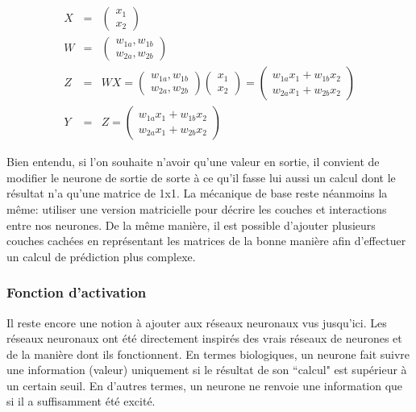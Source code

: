 \documentclass[11pt,a4paper]{report}
\begin{document}
    \begin{eqnarray}
    X &=& \begin{pmatrix} x_1 \\ x_2 \end{pmatrix} \\
    W &=& \begin{pmatrix} w_{1a} , w_{1b} \\ w_{2a}, w_{2b} \end{pmatrix} \\
    Z &=& WX  = \begin{pmatrix} w_{1a} , w_{1b} \\ w_{2a}, w_{2b} \end{pmatrix}\begin{pmatrix} x_1 \\ x_2 \end{pmatrix} = \begin{pmatrix} w_{1a}x_1 + w_{1b}x_2 \\ w_{2a}x_1+w_{2b}x_2 \end{pmatrix} \\
    Y &=& Z = \begin{pmatrix} w_{1a}x_1 + w_{1b}x_2 \\ w_{2a}x_1+w_{2b}x_2 \end{pmatrix}
    \end{eqnarray}
    
    \par Bien entendu, si l'on souhaite n'avoir qu'une valeur en sortie, il convient de modifier le neurone de sortie de sorte à ce qu'il fasse lui aussi un calcul dont le résultat n'a qu'une matrice de 1x1. La mécanique de base reste néanmoins la même: utiliser une version matricielle pour décrire les couches et interactions entre nos neurones. De la même manière, il est possible d'ajouter plusieurs couches cachées en représentant les matrices de la bonne manière afin d'effectuer un calcul de prédiction plus complexe. 
    

  \subsubsection{Fonction d'activation}    
  
    \par Il reste encore une notion à ajouter aux réseaux neuronaux vus jusqu'ici. Les réseaux neuronaux ont été directement inspirés des vrais réseaux de neurones et de la manière dont ils fonctionnent. En termes biologiques, un neurone fait suivre une information (valeur) uniquement si le résultat de son ``calcul" est supérieur à un certain seuil. En d'autres termes, un neurone ne renvoie une information que si il a suffisamment été excité. 
    
\end{document}
